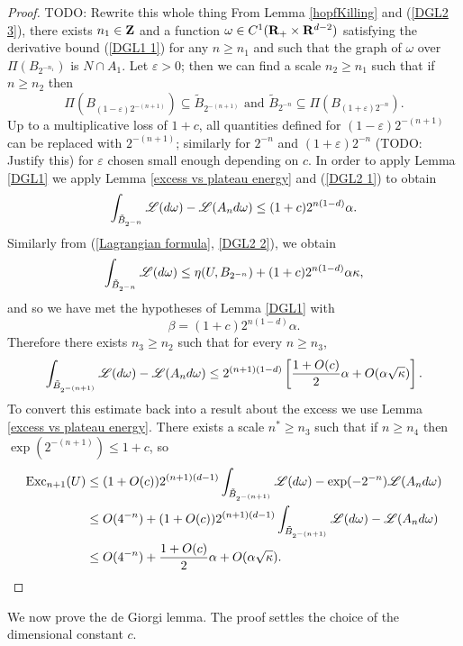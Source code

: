 \begin{proof}
TODO: Rewrite this whole thing
From Lemma \ref{hopfKilling} and (\ref{DGL2 3}), there exists $n_1 \in \mathbf{Z}$ and a function $\omega \in C^1(\mathbf{R}_+ \times \mathbf{R}^{d - 2})$ satisfying the derivative bound (\ref{DGL1 1}) for any $n \geq n_1$
and such that the graph of $\omega$ over $\Pi(B_{2^{-n_1}})$ is $N \cap A_1$.
Let $\varepsilon > 0$; then we can find a scale $n_2 \geq n_1$ such that if $n \geq n_2$ then
$$\Pi(B_{(1 - \varepsilon) 2^{-(n+1)}}) \subseteq \tilde B_{2^{-(n+1)}} \text{ and } \tilde B_{2^{-n}} \subseteq \Pi(B_{(1 + \varepsilon) 2^{-n}}).$$
Up to a multiplicative loss of $1 + c$, all quantities defined for $(1 - \varepsilon)2^{-(n + 1)}$ can be replaced with $2^{-(n + 1)}$; similarly for $2^{-n}$ and $(1 + \varepsilon) 2^{-n}$ (TODO: Justify this) for $\varepsilon$ chosen small enough depending on $c$.
In order to apply Lemma \ref{DGL1} we apply Lemma \ref{excess vs plateau energy} and (\ref{DGL2 1}) to obtain
$$\int_{\tilde B_{2^{-n}}} \mathscr L(d\omega) - \mathscr L(A_n d\omega) \leq (1 + c)2^{n(1 - d)}\alpha.$$
Similarly from (\ref{Lagrangian formula}, \ref{DGL2 2}), we obtain
$$\int_{\tilde B_{2^{-n}}} \mathscr L(d\omega) \leq \eta(U, B_{2^{-n}}) + (1 + c) 2^{n(1-d)}\alpha \kappa,$$
and so we have met the hypotheses of Lemma \ref{DGL1} with
$$\beta = (1 + c)2^{n(1 - d)}\alpha.$$
Therefore there exists $n_3 \geq n_2$ such that for every $n \geq n_3$,
$$\int_{\tilde B_{2^{-(n+1)}}} \mathscr L(d\omega) - \mathscr L(A_nd\omega) \leq 2^{(n + 1)(1-d)}\left[ \frac{1 + O(c)}{2} \alpha + O(\alpha \sqrt \kappa)\right].$$
To convert this estimate back into a result about the excess we use Lemma \ref{excess vs plateau energy}.
There exists a scale $n^* \geq n_3$ such that if $n \geq n_4$ then $\exp(2^{-(n + 1)}) \leq 1 + c$, so
\begin{align*}
\operatorname{Exc}_{n + 1}(U) &\leq (1 + O(c)) 2^{(n+1)(d-1)} \int_{\tilde B_{2^{-(n+1)}}} \mathscr L(d\omega) - \exp(-2^{-n}) \mathscr L(A_nd\omega)\\
&\leq O(4^{-n}) + (1 + O(c)) 2^{(n+1)(d-1)} \int_{\tilde B_{2^{-(n+1)}}} \mathscr L(d\omega) - \mathscr L(A_nd\omega)\\
&\leq O(4^{-n}) + \frac{1 + O(c)}{2} \alpha + O(\alpha \sqrt \kappa). \qedhere
\end{align*}
\end{proof}

We now prove the de Giorgi lemma.
The proof settles the choice of the dimensional constant $c$.

